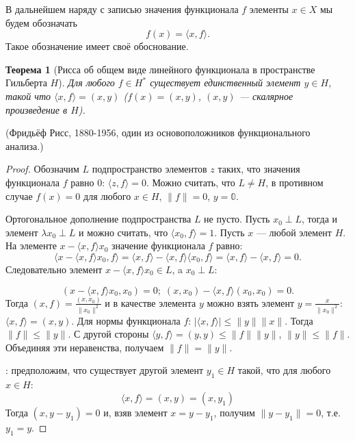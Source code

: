\documentclass[12pt,a4paper,titlepage,oneside]{book}
\theoremstyle{definition}
\theoremstyle{plain}
\newtheorem*{theorem}{Теорема}
\theoremstyle{break}
\theoremstyle{remark}
\theoremstyle{remark}
\theoremstyle{remark}
\theoremstyle{remark}
\theoremstyle{plain}
\theoremstyle{plain}
\begin{document}
В дальнейшем наряду с записью значения функционала $f$ элементы $x \in X$ мы будем обозначать
\begin{equation*}
f(x) =  \langle x, f \rangle.
\end{equation*}
Такое обозначение имеет своё обоснование.
\begin{theorem}[Рисса об общем виде линейного функционала в пространстве Гильберта $H$]
Для любого $f \in H^*$ существует единственный элемент $y \in H$, такой что $ \langle x, f \rangle =(x,y)$ ($f(x)=(x,y)$, $(x,y)$ --- скалярное произведение в $H$).
\end{theorem}
(Фридьёф Рисс, 1880-1956, один из основоположников функционального анализа.)
\begin{proof}
Обозначим $L$ подпространство элементов $z$ таких, что значения функционала $f$ равно 0: $ \langle z, f \rangle =0$. Можно считать, что $L\ne H$, в противном случае $f(x)=0$ для любого $x\in H$, $\lVert f\rVert = 0$, $y=\mathbb{0}$.

Ортогональное дополнение подпространства $L$ не пусто. Пусть $x_0\perp L$, тогда и элемент $\lambda x_0\perp L$ и можно считать, что $ \langle x_0, f \rangle =1$.
Пусть $x$ --- любой элемент $H$. На элементе $x - \langle x, f \rangle x_0$ значение функционала $f$ равно:
\begin{equation*}
 \langle x- \langle x, f \rangle x_0, f \rangle  =  \langle x, f \rangle - \langle x, f \rangle  \langle x_0, f \rangle  =  \langle x, f \rangle - \langle x, f \rangle  = 0.
\end{equation*}
Следовательно элемент $x - \langle x, f \rangle x_0 \in L$, a $x_0\perp L$:

\begin{equation*}
(x- \langle x, f \rangle x_0, x_0) = 0; \; (x, x_0) -  \langle x, f \rangle (x_0, x_0) = 0.
\end{equation*}
Тогда $(x, f) = \frac{(x, x_0)}{\lVert x_0\rVert^2}$ и в качестве элемента $y$ можно взять элемент $y=\frac{x}{\lVert x_0\rVert^2}$: $ \langle x, f \rangle  = (x, y)$.
Для нормы функционала $f$: $\lvert  \langle x, f \rangle \rvert \leqslant \lVert y\rVert\lVert x\rVert$. Тогда $\lVert f\rVert \leqslant \lVert y\rVert$. С другой стороны $ \langle y, f \rangle  = (y, y) \leqslant \lVert f\rVert\lVert y\rVert$, $\lVert y\rVert\le\lVert f\rVert$.
Объединяя эти неравенства, получаем $\lVert f\rVert = \lVert y\rVert$.

: предположим, что существует другой элемент $y_1 \in H$ такой, что для любого $x\in H$:
\begin{equation*}
 \langle x, f \rangle  = (x, y) = (x, y_1)
\end{equation*}
Тогда $(x, y-y_1) = 0$ и, взяв элемент $x = y-y_1$, получим $\lVert y-y_1\rVert = 0$, т.е. $y_1 = y$.
\end{proof}
\end{document}

